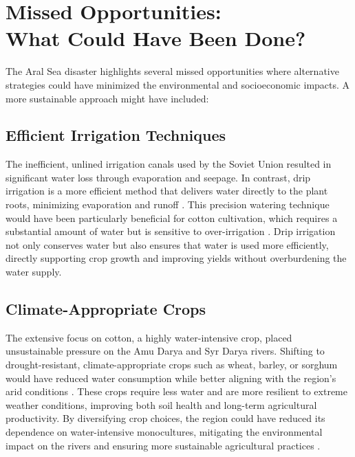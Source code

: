 

\chapter[Missed Opportunities: What Could Have Been Done?]{Missed Opportunities:\\What Could Have Been Done?}
\label{cp:missed-opportunities}

\vspace{.935em}

The Aral Sea disaster highlights several missed opportunities where alternative strategies could have minimized the environmental and socioeconomic impacts. A more sustainable
approach might have included:

\section{Efficient Irrigation Techniques}
The inefficient, unlined irrigation canals used by the Soviet Union resulted in significant water loss through evaporation and seepage. In contrast, drip irrigation is a more efficient method that delivers water directly to the plant roots, minimizing evaporation and runoff \autocite{uri_drip}. This precision watering technique would have been particularly beneficial for cotton cultivation, which requires a substantial amount of water but is sensitive to over-irrigation \autocite{cotton2025water}. Drip irrigation not only conserves water but also ensures that water is used more efficiently, directly supporting crop growth and improving yields without overburdening the water supply.

\section{Climate-Appropriate Crops}
The extensive focus on cotton, a highly water-intensive crop, placed unsustainable pressure on the Amu Darya and Syr Darya rivers. Shifting to drought-resistant, climate-appropriate
crops such as wheat, barley, or sorghum would have reduced water consumption while better aligning with the region's arid conditions \autocite{lodhi2020wheat}\autocite{chadalavada2022sorghum}. These crops require less water and are more resilient to extreme weather conditions, improving both soil health and long-term agricultural productivity. By diversifying crop choices, the region could have reduced its dependence on water-intensive monocultures, mitigating the environmental impact on the rivers and ensuring more sustainable agricultural practices \autocite{rustamova2023crop}.

